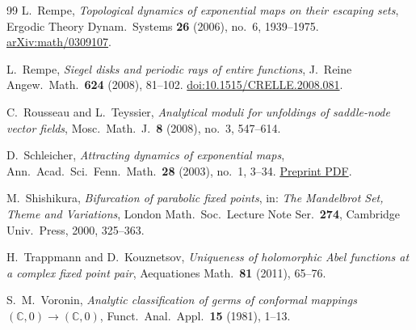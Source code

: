 \documentclass[11pt,a4paper]{article}
\theoremstyle{definition}
\begin{document}
\begin{thebibliography}{99}
L.~Rempe,
\emph{Topological dynamics of exponential maps on their escaping sets},
Ergodic Theory Dynam.\ Systems \textbf{26} (2006), no.~6, 1939--1975.
\href{https://arxiv.org/abs/math/0309107}{arXiv:math/0309107}.

L.~Rempe,
\emph{Siegel disks and periodic rays of entire functions},
J.\ Reine Angew.\ Math.\ \textbf{624} (2008), 81--102.
\href{https://doi.org/10.1515/CRELLE.2008.081}{doi:10.1515/CRELLE.2008.081}.

C.~Rousseau and L.~Teyssier,
\emph{Analytical moduli for unfoldings of saddle-node vector fields},
Mosc.\ Math.\ J.\ \textbf{8} (2008), no.~3, 547--614.

D.~Schleicher,
\emph{Attracting dynamics of exponential maps},
Ann.\ Acad.\ Sci.\ Fenn.\ Math.\ \textbf{28} (2003), no.~1, 3--34.
\href{https://www.math.stonybrook.edu/preprints/ims00-04.pdf}{Preprint PDF}.

M.~Shishikura,
\emph{Bifurcation of parabolic fixed points},
in: \emph{The Mandelbrot Set, Theme and Variations},
London Math.\ Soc.\ Lecture Note Ser.\ \textbf{274},
Cambridge Univ.\ Press, 2000, 325--363.

H.~Trappmann and D.~Kouznetsov,
\emph{Uniqueness of holomorphic Abel functions at a complex fixed point pair},
Aequationes Math.\ \textbf{81} (2011), 65--76.

S.~M.~Voronin,
\emph{Analytic classification of germs of conformal mappings
$(\mathbb C,0)\to(\mathbb C,0)$},
Funct.\ Anal.\ Appl.\ \textbf{15} (1981), 1--13.

\end{thebibliography}
\end{document}
